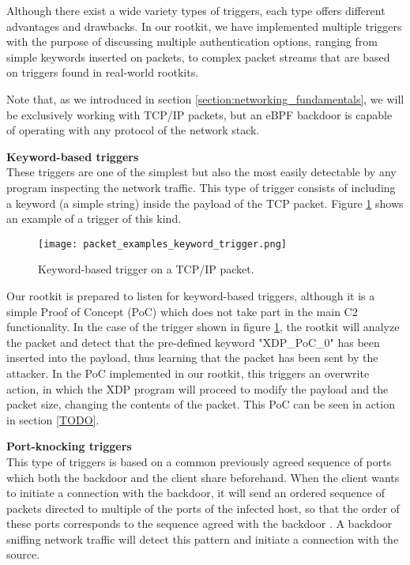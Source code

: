 Although there exist a wide variety types of triggers, each type offers different advantages and drawbacks. In our rootkit, we have implemented multiple triggers with the purpose of discussing multiple authentication options, ranging from simple keywords inserted on packets, to complex packet streams that are based on triggers found in real-world rootkits.

Note that, as we introduced in section \ref{section:networking_fundamentals}, we will be exclusively working with TCP/IP packets, but an eBPF backdoor is capable of operating with any protocol of the network stack.

\textbf{Keyword-based triggers}\\
These triggers are one of the simplest but also the most easily detectable by any program inspecting the network traffic. This type of trigger consists of including a keyword (a simple string) inside the payload of the TCP packet. Figure \ref{fig:keyword_trigger} shows an example of a trigger of this kind.

\begin{figure}[htbp]
	\centering
	\texttt{[image: packet\_examples\_keyword\_trigger.png]}
	\caption{Keyword-based trigger on a TCP/IP packet.}
	\label{fig:keyword_trigger}
\end{figure}

Our rootkit is prepared to listen for keyword-based triggers, although it is a simple Proof of Concept (PoC) which does not take part in the main C2 functionality. In the case of the trigger shown in figure \ref{fig:keyword_trigger}, the rootkit will analyze the packet and detect that the pre-defined keyword "XDP\_PoC\_0" has been inserted into the payload, thus learning that the packet has been sent by the attacker. In the PoC implemented in our rootkit, this triggers an overwrite action, in which the XDP program will proceed to modify the payload and the packet size, changing the contents of the packet. This PoC can be seen in action in section \ref{TODO}.

\textbf{Port-knocking triggers}\\
This type of triggers is based on a common previously agreed sequence of ports which both the backdoor and the client share beforehand. When the client wants to initiate a connection with the backdoor, it will send an ordered sequence of packets directed to multiple of the ports of the infected host, so that the order of these ports corresponds to the sequence agreed with the backdoor \cite{port_knocking}. A backdoor sniffing network traffic will detect this pattern and initiate a connection with the source.

